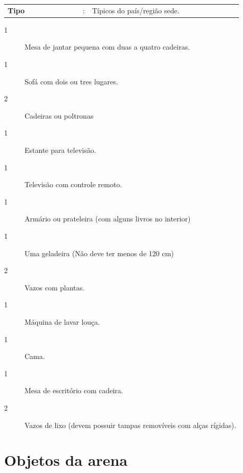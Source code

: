 \documentclass[11pt, twoside, openright, a4paper, chapterprefix]{article}
\begin{document}
\begin{tabular}{ p{0.3\linewidth} p{0.01\linewidth} p{0.6\linewidth}}
    \textbf{Tipo}       & : & Típicos do país/região sede. \\
\end{tabular}

\begin{description}
    \item [1] Mesa de jantar pequena com duas a quatro cadeiras.
    \item [1] Sofá com dois ou tres lugares. 
    \item [2] Cadeiras ou poltronas 
    \item [1] Estante para televisão.
    \item [1] Televisão com controle remoto.
    \item [1] Armário ou prateleira (com alguns livros no interior) 
    \item [1] Uma geladeira (Não deve ter menos de 120 cm)
    \item [2] Vazos com plantas.
    \item [1] Máquina de lavar louça.
    \item [1] Cama.
    \item [1] Mesa de escritório com cadeira.
    \item [2] Vazos de lixo (devem possuir tampas removíveis com alças rígidas).
\end{description}

\section{Objetos da arena}
\end{document}
